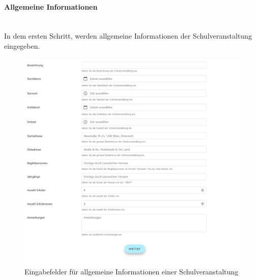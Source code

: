\paragraph{Allgemeine Informationen}~\\
In dem ersten Schritt, werden allgemeine Informationen der Schulveranstaltung eingegeben.
\begin{figure}[H]
	\centering
	\includegraphics[width=1\linewidth]{images/schoolgeneral}
	\caption[Schulveranstaltung]{Eingabefelder für allgemeine Informationen einer Schulveranstaltung}
	\label{fig:schoolgeneral}
\end{figure}
